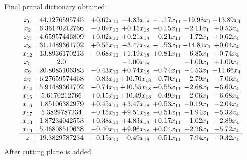 \documentclass[8pt]{article}
\begin{document}
 Final primal dictionary obtained: 
\[\begin{array}{c| c c@{\hskip 2pt} c@{\hskip 2pt} c@{\hskip 2pt} c@{\hskip 2pt} c@{\hskip 2pt} }
 x_{6}   &  44.1276595745 & +  0.62 x_{10} & -4.83 x_{18} & -1.17 x_{11} & -19.98 x_{1} & + 13.89 x_{4}\\
 x_{2}   &  6.36170212766 & -0.09 x_{10} & +  0.15 x_{18} & -0.15 x_{11} & -2.11 x_{1} & +  0.53 x_{4}\\
 x_{3}   &  4.65957446809 & +  0.02 x_{10} & +  0.21 x_{18} & -0.21 x_{11} & -1.72 x_{1} & +  0.62 x_{4}\\
 x_{8}   &  31.1489361702 & +  0.55 x_{10} & -3.47 x_{18} & -1.53 x_{11} & -14.81 x_{1} & +  0.04 x_{4}\\
 x_{12}   &  13.8936170213 & -0.68 x_{10} & +  1.19 x_{18} & +  0.81 x_{11} & -6.85 x_{1} & -0.74 x_{4}\\
 x_{5}   &  2.0  &   & -1.00 x_{18} &   & -1.00 x_{1} & +  1.00 x_{4}\\
 x_{9}   &  20.8085106383 & -0.43 x_{10} & +  0.74 x_{18} & -0.74 x_{11} & -4.53 x_{1} & + 11.66 x_{4}\\
 x_{7}   &  6.27659574468 & -0.83 x_{10} & + 10.70 x_{18} & -0.70 x_{11} & -2.79 x_{1} & -7.06 x_{4}\\
 x_{14}   &  5.91489361702 & -0.74 x_{10} & + 10.55 x_{18} & -0.55 x_{11} & -2.68 x_{1} & -6.60 x_{4}\\
 x_{15}   &  5.6170212766 & +  0.15 x_{10} & + 10.49 x_{18} & -0.49 x_{11} & -2.06 x_{1} & -6.68 x_{4}\\
 x_{16}   &  1.85106382979 & +  0.45 x_{10} & +  3.47 x_{18} & +  0.53 x_{11} & -0.19 x_{1} & -2.04 x_{4}\\
 x_{17}   &  5.3829787234 & -0.15 x_{10} & +  9.51 x_{18} & -0.51 x_{11} & -1.94 x_{1} & -5.32 x_{4}\\
 x_{13}   &  1.87234042553 & +  0.38 x_{10} & +  4.83 x_{18} & +  0.17 x_{11} & -1.02 x_{1} & -2.89 x_{4}\\
 x_{19}   &  5.46808510638 & -0.40 x_{10} & +  9.96 x_{18} & +  0.04 x_{11} & -2.26 x_{1} & -5.72 x_{4}\\
\hline
z    &  19.3829787234 & -0.15 x_{10} & -0.49 x_{18} & -0.51 x_{11} & -7.94 x_{1} & -0.32 x_{4}\\
\end{array}\]
 After cutting plane is added 
\end{document}
